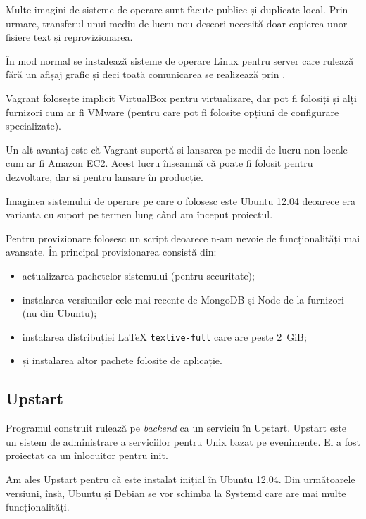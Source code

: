 \documentclass[a4wide,12pt]{report}
\newcommand{\eng}[1]{\emph{#1}} %
\newcommand{\cod}[1]{\texttt{#1}}
\newcommand{\acr}[1]{{\textsmaller[1]{\textsc{#1}}}} %
\begin{document}
Multe imagini de sisteme de operare sunt făcute publice și duplicate local. Prin
urmare, transferul unui mediu de lucru nou deseori necesită doar copierea unor
fișiere text și reprovizionarea.

În mod normal se instalează sisteme de operare Linux pentru server care rulează
fără un afișaj grafic și deci toată comunicarea se realizează prin \acr{SSH}.

Vagrant folosește implicit VirtualBox pentru virtualizare, dar pot fi folosiți
și alți furnizori cum ar fi VMware (pentru care pot fi folosite opțiuni de
configurare specializate).

Un alt avantaj este că Vagrant suportă și lansarea pe medii de lucru non-locale
cum ar fi Amazon EC2. Acest lucru înseamnă că poate fi folosit pentru
dezvoltare, dar și pentru lansare în producție.

Imaginea sistemului de operare pe care o folosesc este Ubuntu 12.04 deoarece era
varianta cu suport pe termen lung când am început proiectul.

Pentru provizionare folosesc un script deoarece n-am nevoie de funcționalități
mai avansate. În principal provizionarea consistă din:

\begin{itemize}

\item actualizarea pachetelor sistemului (pentru securitate);

\item instalarea versiunilor cele mai recente de MongoDB și Node de la furnizori
(nu din Ubuntu);

\item instalarea distribuției \LaTeX{} \cod{texlive-full} care are peste 2~GiB;

\item și instalarea altor pachete folosite de aplicație.

\end{itemize}

\subsection{Upstart}

Programul construit rulează pe \eng{backend} ca un serviciu în Upstart. Upstart
este un sistem de administrare a serviciilor pentru Unix bazat pe evenimente. El
a fost proiectat ca un înlocuitor pentru init.

Am ales Upstart pentru că este instalat inițial în Ubuntu 12.04. Din următoarele
versiuni, însă, Ubuntu și Debian se vor schimba la Systemd care are mai multe
funcționalități.
\end{document}
